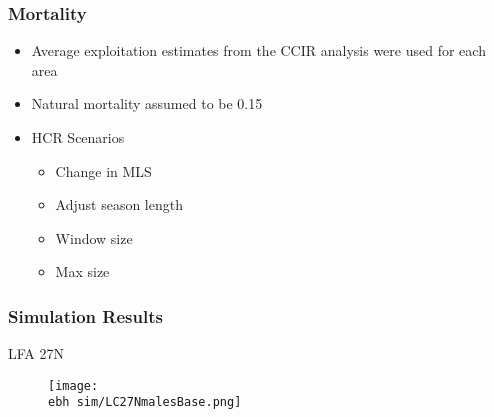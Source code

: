 \documentclass{beamer}
\newcommand{\ebh}{\string~/bio.data/bio.lobster/figures/LFA2733Framework2018/} %
\begin{document}
\begin{frame}
\frametitle{Mortality}
\begin{itemize}
\item Average exploitation estimates from the CCIR analysis were used for each area
\item Natural mortality assumed to be 0.15



\item HCR Scenarios
\begin{itemize}
\item Change in MLS
\item Adjust season length
\item Window size
\item Max size
\end{itemize}

\end{itemize}
\end{frame}



\begin{frame}
\frametitle{Simulation Results}
LFA 27N 
\begin{figure}
        \begin{center}
            \texttt{[image: \\ebh sim/LC27NmalesBase.png]}
        \end{center}
    \end{figure}
\end{frame}
\end{document}
